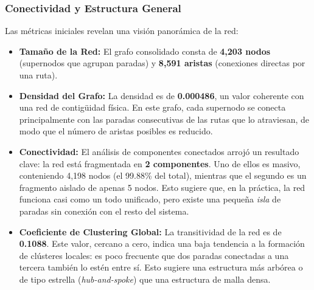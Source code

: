         \subsubsection{Conectividad y Estructura General}
            Las métricas iniciales revelan una visión panorámica de la red:
            \begin{itemize}
                \item \textbf{Tamaño de la Red:} El grafo consolidado consta de \textbf{4,203 nodos} (supernodos que agrupan paradas) y \textbf{8,591 aristas} (conexiones directas por una ruta).
		\item \textbf{Densidad del Grafo:} La densidad es de \textbf{0.000486}, un valor coherente con una red de contigüidad física. En este grafo, cada supernodo se conecta principalmente con las paradas consecutivas de las rutas que lo atraviesan, de modo que el número de aristas posibles es reducido.
                \item \textbf{Conectividad:} El análisis de componentes conectados arrojó un resultado clave: la red está fragmentada en \textbf{2 componentes}. Uno de ellos es masivo, conteniendo 4,198 nodos (el 99.88\% del total), mientras que el segundo es un fragmento aislado de apenas 5 nodos. Esto sugiere que, en la práctica, la red funciona casi como un todo unificado, pero existe una pequeña \textit{isla} de paradas sin conexión con el resto del sistema.
                \item \textbf{Coeficiente de Clustering Global:} La transitividad de la red es de \textbf{0.1088}. Este valor, cercano a cero, indica una baja tendencia a la formación de clústeres locales: es poco frecuente que dos paradas conectadas a una tercera también lo estén entre sí. Esto sugiere una estructura más arbórea o de tipo estrella (\textit{hub-and-spoke}) que una estructura de malla densa.
            \end{itemize}

